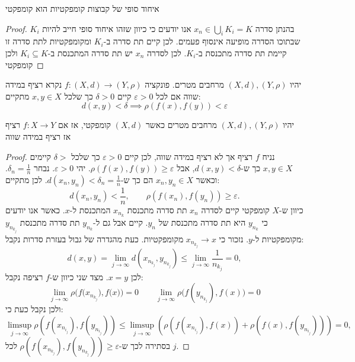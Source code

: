 \documentclass{tstextbook}
\begin{document}
\begin{proposition}
איחוד סופי של קבוצות קומפקטיות הוא קומפקטי

\end{proposition}
\begin{proof}
בהנתן סדרה \(x_{n}\in \bigcup_{i}K_{i}=K\) אנו יודעים כי כיוון שזהו איחוד סופי חייב להיות \(K_{i}\) שבתוכו הסדרה מופיעה אינסוף פעמים. לכן קיים תת סדרה ב-\(K_{i}\) ומקומפקטיות לתת סדרה זו קיימת תת סדרה מתכנסת ב-\(K_{i}\). לכן לסדרה \(x_{n}\) יש תת סדרה המתכנסת ב-\(K_{i}\subseteq K\) ולכן קומפקטי

\end{proof}
\begin{definition}
יהיו \((X,d), \left( Y,\rho \right)\) מרחבים מטרים. פונקציה \(f:(X,d)\to \left( Y,\rho \right)\) נקרא רציף במידה שווה אם לכל \(\varepsilon>0\) קיים \(\delta>0\) כך שלכל \(x,y\in X\) מתקיים:
$$d(x,y)<\delta\implies \rho(f(x),f(y))<\varepsilon$$

\end{definition}
\begin{proposition}
יהיו \((X,d),\left( Y,\rho \right)\) מרחבים מטרים כאשר \((X,d)\)  קומפקטי, אז אם \(f: X\to Y\) רציף אז רציף במידה שווה

\end{proposition}
\begin{proof}
נניח \(f\) רציף אך לא רציף במידה שווה, לכן קיים \(\varepsilon>0\) כך שלכל \(\delta>\) קיימים \(x,y\in X\) כך ש-\(d(x,y)<\delta\), אבל \(\rho(f(x),f(y))\geq\varepsilon\). 
יהי \(\varepsilon>0\). נבחר \(\delta_{n}=\frac{1}{n}\). וכאשר  \(x_{n},y_{n}\in X\)  הם כך ש-\(d(x_{n},y_{n})<\delta_{n}=\frac{1}{n}\). לכן מתקיים:
$$d(x_{n},y_{n})<{\frac{1}{n}},\qquad\rho(f(x_{n}),f(y_{n}))\geq\varepsilon.$$
כיוון ש-\(X\) קומפקטי קיים לסדרה \(x_{n}\) תת סדרה מתכנסת \(x_{n_{k}}\) המתכנסת ל-\(x\). כאשר אנו יודעים כי \(y_{n_{k}}\) היא תת סדרה מתכנסת של \(y_{n}\). קיים אבל גם ל-\(y_{n_{k}}\) תת סדרה מתכנסת \(y_{n_{k_{j}}}\) מקומפקטיות ל-\(y\). נזכור כי \(x_{n_{k_{j}}}\to x\) מקומפקטיות.  כעת מהגדרה של גבול בעזרת סדרות נקבל:
$$d(x,y)=\operatorname*{lim}_{j\to\infty}d(x_{n_{k_{j}}},y_{n_{k_{j}}})\leq\operatorname*{lim}_{j\to\infty}{\frac{1}{n_{k_{j}}}}=0,$$
לכן \(x=y\). מצד שני כיוון ש-\(f\) רציפה נקבל:
$$\lim_{j\to\infty}\rho\bigl(f\bigl(x_{n_{k_{j}}}\bigr),f\bigl(x\bigr)\bigr)=0 \qquad \lim_{j\to\infty}\rho\bigl(f(y_{n_{k_{j}}}),f(x)\bigr)=0$$
ולכן נקבל כעת כי:
$$\operatorname*{lim sup}_{j\to\infty}\rho(f(x_{n_{i_{j}}}),f(y_{n_{i_{j}}}))\leq\operatorname*{lim sup}_{j\to\infty}\left(\rho(f(x_{n_{i_{j}}}),f(x))+\rho(f(x),f(y_{n_{i_{j}}}))\right)=0,$$
בסתירה לכך ש-\(\rho(f(x_{n_{k_{j}}}),f(y_{n_{k_{j}}}))\geq\varepsilon\) לכל \(j\).

\end{proof}
\end{document}
